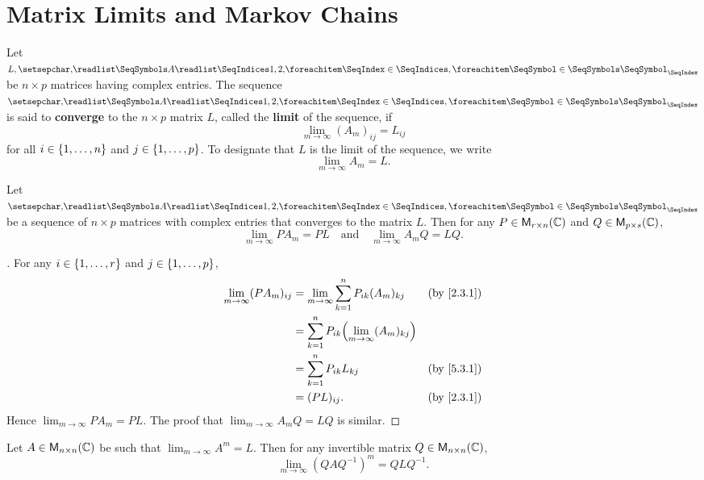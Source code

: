 \section{Matrix Limits and Markov Chains}\label{sec:5.3}

\begin{defn}\label{5.3.1}
  Let \(L, \seq{A}{1,2,}\) be \(n \times p\) matrices having complex entries.
  The sequence \(\seq{A}{1,2,}\) is said to \textbf{converge} to the \(n \times p\) matrix \(L\), called the \textbf{limit} of the sequence, if
  \[
    \lim_{m \to \infty} (A_m)_{i j} = L_{i j}
  \]
  for all \(i \in \left\lbrace1, \dots, n\right\rbrace\) and \(j \in \left\lbrace1, \dots, p\right\rbrace\).
  To designate that \(L\) is the limit of the sequence, we write
  \[
    \lim_{m \to \infty} A_m = L.
  \]
\end{defn}

\begin{thm}\label{5.12}
  Let \(\seq{A}{1,2,}\) be a sequence of \(n \times p\) matrices with complex entries that converges to the matrix \(L\).
  Then for any \(P \in \mathsf{M}_{{r} \times n}({\mathbb{C}})\) and \(Q \in \mathsf{M}_{{p} \times s}({\mathbb{C}})\),
  \[
    \lim_{m \to \infty} P A_m = PL \quad \text{and} \quad \lim_{m \to \infty} A_m Q = LQ.
  \]
\end{thm}

\begin{proof}[]
  For any \(i \in \left\lbrace1, \dots, r\right\rbrace\) and \(j \in \left\lbrace1, \dots, p\right\rbrace\),
  \begin{align*}
    \lim_{m \to \infty} (P A_m)_{i j} & = \lim_{m \to \infty} \sum_{k = 1}^n P_{i k} (A_m)_{k j}      &  & \text{(by \cref{2.3.1})} \\
                                      & = \sum_{k = 1}^n P_{i k} \pa{\lim_{m \to \infty} (A_m)_{k j}}                               \\
                                      & = \sum_{k = 1}^n P_{i k} L_{k j}                              &  & \text{(by \cref{5.3.1})} \\
                                      & = (PL)_{i j}.                                                 &  & \text{(by \cref{2.3.1})}
  \end{align*}
  Hence \(\lim_{m \to \infty} P A_m = PL\).
  The proof that \(\lim_{m \to \infty} A_m Q = LQ\) is similar.
\end{proof}

\begin{cor}\label{5.3.2}
  Let \(A \in \mathsf{M}_{{n} \times n}({\mathbb{C}})\) be such that \(\lim_{m \to \infty} A^m = L\).
  Then for any invertible matrix \(Q \in \mathsf{M}_{{n} \times n}({\mathbb{C}})\),
  \[
    \lim_{m \to \infty} (Q A Q^{-1})^m = Q L Q^{-1}.
  \]
\end{cor}

